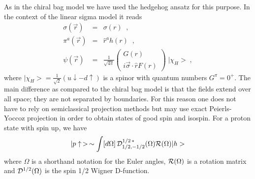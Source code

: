 As in the chiral bag model we have used the hedgehog ansatz 
for this purpose. In the context of the linear sigma model
it reads
\alpheqn 
\begin{eqnarray}
\label{hed}
\sigma (\vec{r}) &=& \sigma (r)  \;\; , \\
\pi^a (\vec{r}) &=& \hat{r}^a h(r) \;\; ,\\
\psi(\vec{r}) &=& \frac{1}{\sqrt{4\pi}}\left(
\begin{array}{c} G(r)\\ i\vec{\sigma}\cdot\hat{r} F(r) \end{array}
\right)\;|\chi_H> \; ,
\end{eqnarray}
\reseteqn
where $|\chi_H>=\frac{1}{\sqrt{2}}(u\!\downarrow-d\!\uparrow)$ is a 
spinor with quantum numbers $G^{\pi}=0^{+}$. The main difference as compared
to the chiral bag model is that  the fields extend over
all space; they are not separated by boundaries. For this reason
one does not have to rely on semiclassical projection methods but may
use exact Peierls-Yoccoz projection in order to obtain states of good
spin and isospin. For a proton state with spin up, we have
\begin{equation}
\label{pro}
|p\uparrow\,>\, \sim \int [d\Omega]\, {\cal D}_{1/2,-1/2}^{1/2\, *}
(\Omega){\cal R}(\Omega)|h>
\end{equation}
where $\Omega$ is a shorthand notation for the Euler angles, ${\cal R}
(\Omega)$ is a rotation matrix and ${\cal D}^{1/2}(\Omega)$ is the spin 1/2
Wigner D-function. 

